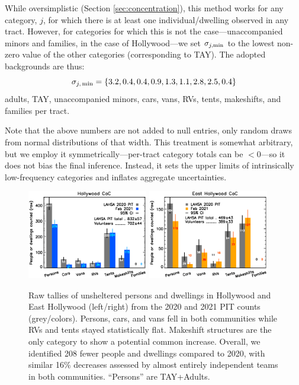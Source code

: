 \documentclass[11pt,twocolumn]{article}
\begin{document}
While oversimplistic (Section \ref{sec:concentration}), this method works for any category, 
$j$, for which there is at least one individual/dwelling observed in any 
tract. However, for categories for which this is not the case---unaccompanied minors and families, in the
case of Hollywood---we set $\sigma_{j, \rm min}$ to the lowest non-zero value of the other categories
(corresponding to TAY). The adopted backgrounds are thus: 
\begin{equation}
	\sigma_{j,\, \rm min}=\{3.2, 0.4, 0.4, 0.9, 1.3, 1.1, 2.8, 2.5, 0.4\}
\end{equation}
adults, TAY, unaccompanied minors, cars, vans, RVs, tents, makeshifts, and families per tract. 

Note that the above numbers are not added to null entries, only random draws from normal distributions
of that width. This treatment is somewhat arbitrary, but we employ it symmetrically---per-tract category 
totals can be $<$0---so it does not bias the final inference. Instead, it sets the upper limits of intrinsically 
low-frequency categories and inflates aggregate uncertainties.

\begin{figure}[t]
	\centering
	\includegraphics[width = 0.47\textwidth, trim = 1cm 0cm 0cm 0cm]{Hwood2021Bars}
	\includegraphics[width = 0.47\textwidth, trim = 0cm 0cm 1cm 0cm]{Eho2021Bars}
	\caption{Raw tallies of unsheltered persons and dwellings in Hollywood and East Hollywood
			(left/right) from the 2020 and 2021 PIT counts (grey/colors). Persons, cars, 
			and vans fell in both communities while RVs and tents stayed statistically flat. 
			Makeshift structures are the only category to show a potential common increase. 
			Overall, we identified 208 fewer people and dwellings compared to 2020,
			with similar 16\% decreases assessed by almost entirely independent teams
			in both communities. ``Persons'' are TAY+Adults.}
	\label{fig:rawCounts}
\end{figure}
\end{document}
